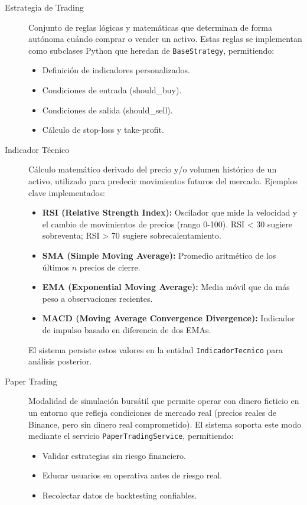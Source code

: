 \begin{description}
    \item[Estrategia de Trading] Conjunto de reglas lógicas y matemáticas que determinan de forma autónoma cuándo comprar o vender un activo. Estas reglas se implementan como subclases Python que heredan de \texttt{BaseStrategy}, permitiendo:
    \begin{itemize}
        \item Definición de indicadores personalizados.
        \item Condiciones de entrada (should\_buy).
        \item Condiciones de salida (should\_sell).
        \item Cálculo de stop-loss y take-profit.
    \end{itemize}

    \item[Indicador Técnico] Cálculo matemático derivado del precio y/o volumen histórico de un activo, utilizado para predecir movimientos futuros del mercado. Ejemplos clave implementados:
    \begin{itemize}
        \item \textbf{RSI (Relative Strength Index):} Oscilador que mide la velocidad y el cambio de movimientos de precios (rango 0-100). RSI < 30 sugiere sobreventa; RSI > 70 sugiere sobrecalentamiento.
        \item \textbf{SMA (Simple Moving Average):} Promedio aritmético de los últimos $n$ precios de cierre.
        \item \textbf{EMA (Exponential Moving Average):} Media móvil que da más peso a observaciones recientes.
        \item \textbf{MACD (Moving Average Convergence Divergence):} Indicador de impulso basado en diferencia de dos EMAs.
    \end{itemize}
    El sistema persiste estos valores en la entidad \texttt{IndicadorTecnico} para análisis posterior.

    \item[Paper Trading] Modalidad de simulación bursátil que permite operar con dinero ficticio en un entorno que refleja condiciones de mercado real (precios reales de Binance, pero sin dinero real comprometido). El sistema soporta este modo mediante el servicio \texttt{PaperTradingService}, permitiendo:
    \begin{itemize}
        \item Validar estrategias sin riesgo financiero.
        \item Educar usuarios en operativa antes de riesgo real.
        \item Recolectar datos de backtesting confiables.
    \end{itemize}


\end{description}
